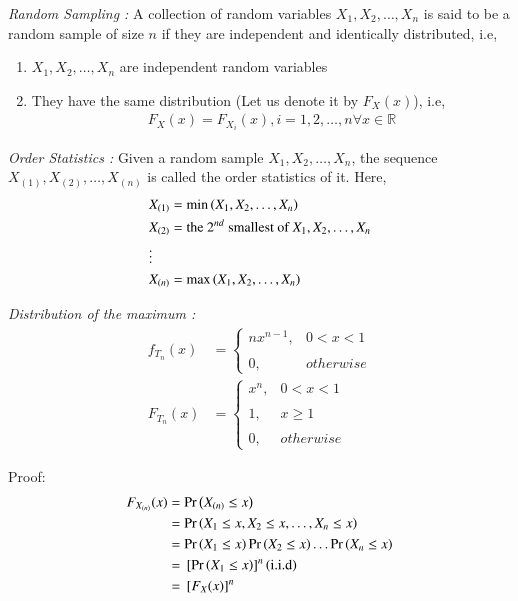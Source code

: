 \begin{definition}
{\em Random Sampling :}
A collection of random variables $X_{1},X_{2},\dots,X_{n}$ is said to be a random sample of size $n$ if they are independent and identically distributed, i.e,
\begin{enumerate}
    \item $X_{1},X_{2},\dots,X_{n}$ are independent random variables
    \item They have the same distribution (Let us denote it by $F_{X}(x)$), i.e,
    \begin{align}
        F_{X}(x)=F_{X_{i}}(x), i = 1,2,\dots,n \forall x\in \mathbb{R}
    \end{align}
\end{enumerate}
\end{definition}
\begin{definition}
{\em Order Statistics :}
Given a random sample $X_{1},X_{2},\dots,X_{n}$, the sequence $X_{(1)},X_{(2)},\dots,X_{(n)}$ is called the order statistics of it. Here,
\begin{align}
    &X_{(1)}=\min\left(X_{1},X_{2},\dots,X_{n}\right)\\
    &X_{(2)}=\text{the }2^{nd}\text{ smallest of }X_{1},X_{2},\dots,X_{n}\\
    &\vdots\\
    &X_{(n)}=\max\left(X_{1},X_{2},\dots,X_{n}\right)
\end{align}
\end{definition}
\begin{lemma}
{\em Distribution of the maximum :}
\begin{align}
	\label{eq:conv/1/pdf}
    f_{T_{n}}(x)&=\begin{cases}
	nx^{n-1}, & 0< x<1 \\~\\[-1em]
	0, & otherwise
	\end{cases}\\
	F_{T_{n}}(x)&=\begin{cases}
	x^{n}, & 0< x<1 \\~\\[-1em]
	1, & x\geq 1\\~\\[-1em]
	0, & otherwise
	\end{cases} 
	\label{eq:conv/1/cdf}
\end{align}
\end{lemma}
Proof:
\begin{align}
   F_{X_{(n)}}(x)&=\Pr\left(X_{(n)}\leq x\right)\\
   &=\Pr\left(X_{1}\leq x,X_{2}\leq x,\dots,X_{n}\leq x\right)\\
   &=\Pr\left(X_{1}\leq x\right)\Pr\left(X_{2}\leq x\right)\dots\Pr\left(X_{n}\leq x\right)\\
   \label{conv/1/eq:F}
   &={}\left[\Pr\left(X_{1}\leq x\right)\right]^{n}\left( \text{i.i.d}\right)\\
   &={}\left[F_{X}(x)\right]^{n}
   \label{eq:conv/1/cdf/max}
\end{align}

